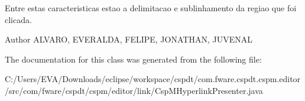 Entre estas caracteristicas estao a delimitacao e sublinhamento da regiao que foi clicada.

\begin{DoxyAuthor}{Author}
A\+L\+V\+A\+RO, E\+V\+E\+R\+A\+L\+DA, F\+E\+L\+I\+PE, J\+O\+N\+A\+T\+H\+AN, J\+U\+V\+E\+N\+AL 
\end{DoxyAuthor}


The documentation for this class was generated from the following file\+:\begin{DoxyCompactItemize}
\item 
C\+:/\+Users/\+E\+V\+A/\+Downloads/eclipse/workspace/cspdt/com.\+fware.\+cspdt.\+cspm.\+editor/src/com/fware/cspdt/cspm/editor/link/Csp\+M\+Hyperlink\+Presenter.\+java\end{DoxyCompactItemize}

